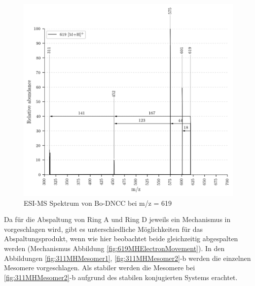 \begin{figure}[!htbp]
  \centering
  \includegraphics[width=\textwidth, height=0.7\textwidth]{figures/Kapitel7/Kataboliten/VWA_MS_619.png}
  \caption[ESI-MS Spektrum von Bo-DNCC, Quelle: Autor]{ESI-MS Spektrum von Bo-DNCC bei m/z = 619 }
  \label{fig:619MH}
\end{figure}

Da für die Abspaltung von Ring A und Ring D jeweils ein Mechanismus in \cite{StructureElucidation} vorgeschlagen wird, gibt es unterschiedliche Möglichkeiten für das Abspaltungsprodukt, wenn wie hier beobachtet beide gleichzeitig abgespalten werden (Mechanismus Abbildung \ref{fig:619MHElectronMovement}). In den Abbildungen \ref{fig:311MHMesomer1}, \ref{fig:311MHMesomer2}-b werden die einzelnen Mesomere vorgeschlagen. Als stabiler werden die Mesomere bei \ref{fig:311MHMesomer2}-b aufgrund des stabilen konjugierten Systems erachtet.

